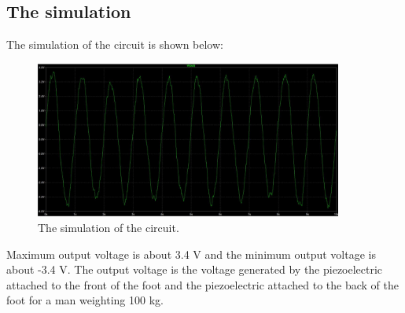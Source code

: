 \subsection{The simulation}
The simulation of the circuit is shown below:
\begin{figure}[H]
    \centering
    \includegraphics[width=0.9\textwidth]{../Report/Figures/3. Result/rsult.jpg}
    \caption{The simulation of the circuit.}
\end{figure}

Maximum output voltage is about 3.4 V and the minimum output voltage is about -3.4 V. The output voltage is the voltage generated by the piezoelectric attached to the front of the foot and the piezoelectric attached to the back of the foot for a man weighting 100 kg.\\
